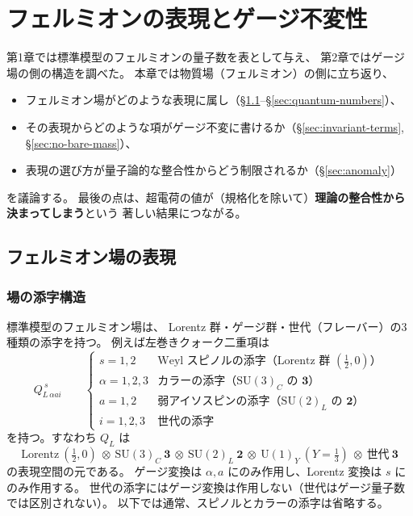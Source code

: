 \documentclass[uplatex,dvipdfmx,a4paper,11pt,openany]{jsbook}
\numberwithin{equation}{chapter}
\theoremstyle{definition}
\theoremstyle{plain}
\theoremstyle{remark}
\newcommand{\SU}{\mathrm{SU}}
\newcommand{\U}{\mathrm{U}}
\begin{document}
\chapter{フェルミオンの表現とゲージ不変性}
第1章では標準模型のフェルミオンの量子数を表として与え、
第2章ではゲージ場の側の構造を調べた。
本章では物質場（フェルミオン）の側に立ち返り、
\begin{itemize}
    \item フェルミオン場がどのような表現に属し（\S\ref{sec:fermion-rep}--\S\ref{sec:quantum-numbers}）、
    \item その表現からどのような項がゲージ不変に書けるか（\S\ref{sec:invariant-terms}, \S\ref{sec:no-bare-mass}）、
    \item 表現の選び方が量子論的な整合性からどう制限されるか（\S\ref{sec:anomaly}）
\end{itemize}
を議論する。
最後の点は、超電荷の値が（規格化を除いて）\textbf{理論の整合性から決まってしまう}という
著しい結果につながる。
\section{フェルミオン場の表現}
\label{sec:fermion-rep}
\subsection{場の添字構造}
標準模型のフェルミオン場は、
Lorentz 群・ゲージ群・世代（フレーバー）の3種類の添字を持つ。
例えば左巻きクォーク二重項は
\begin{equation}
Q_{L\,\alpha a i}^{\ s}
\qquad
\begin{cases}
s=1,2 & \text{Weyl スピノルの添字（Lorentz 群 $(\tfrac12,0)$）}\\
\alpha=1,2,3 & \text{カラーの添字（$\SU(3)_C$ の $\mathbf3$）}\\
a=1,2 & \text{弱アイソスピンの添字（$\SU(2)_L$ の $\mathbf2$）}\\
i=1,2,3 & \text{世代の添字}
\end{cases}
\end{equation}
を持つ。すなわち $Q_L$ は
\begin{equation}
\text{Lorentz}\ (\tfrac12,0)\ \otimes\ \SU(3)_C\ \mathbf3\ \otimes\ \SU(2)_L\ \mathbf2\ \otimes\ \U(1)_Y\ (Y=\tfrac13)\ \otimes\ \text{世代}\ \mathbf3
\end{equation}
の表現空間の元である。
ゲージ変換は $\alpha,a$ にのみ作用し、Lorentz 変換は $s$ にのみ作用する。
世代の添字にはゲージ変換は作用しない（世代はゲージ量子数では区別されない）。
以下では通常、スピノルとカラーの添字は省略する。
\end{document}
